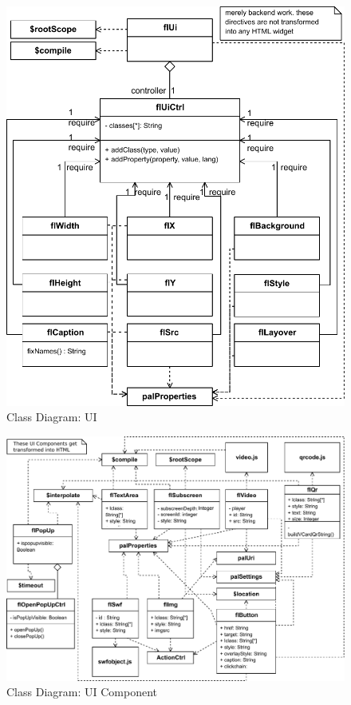 \begin{figure}[htb]
    \centering
    \includegraphics{figures/design-class-ui.pdf}
    \caption{Class Diagram: UI}
    \label{fig:class-ui}
\end{figure}

\begin{figure}
    \centering
    \includegraphics{figures/design-class-uicomponent.pdf}
    \caption{Class Diagram: UI Component}
    \label{fig:class-uicomponent}
\end{figure}

